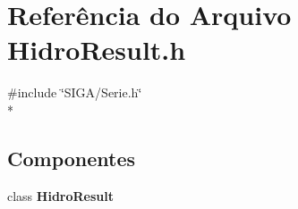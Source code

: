 \section{Referência do Arquivo Hidro\+Result.\+h}
\label{_hidro_result_8h}
{\ttfamily \#include \char`\"{}S\+I\+G\+A/\+Serie.\+h\char`\"{}}\\*
\subsection*{Componentes}
\begin{DoxyCompactItemize}
\item 
class {\bf Hidro\+Result}
\end{DoxyCompactItemize}
